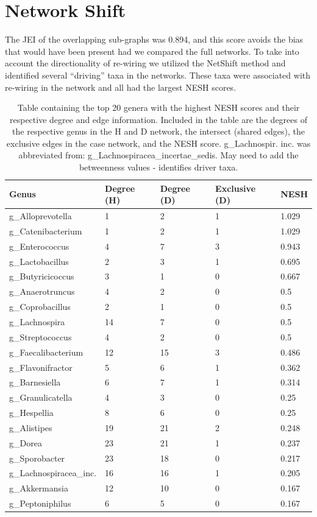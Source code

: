 \section{Network Shift}\label{res:shift}
The \acrfull{JEI} of the overlapping sub-graphs was 0.894, and this score avoids the bias that would have been present had we compared the full networks. To take into account the directionality of re-wiring we utilized the NetShift method and identified several ``driving'' taxa in the networks. These taxa were associated with re-wiring in the network and all had the largest \acrshort{NESH} scores. 
\begin{table}[!hbt]
\centering
\begin{tabular}{lllll}
\toprule
Genus & Degree (H) & Degree (D)  & Exclusive (D) &\acrshort{NESH}\\
\midrule
g\_Alloprevotella & 1 & 2 & 1 & 1.029\\
g\_Catenibacterium & 1 & 2 & 1 & 1.029\\
g\_Enterococcus & 4 & 7 & 3 & 0.943\\
g\_Lactobacillus & 2 & 3 & 1 & 0.695\\
g\_Butyricicoccus & 3 & 1 & 0 & 0.667\\
g\_Anaerotruncus & 4 & 2 & 0 & 0.5\\
g\_Coprobacillus & 2 & 1 & 0 & 0.5\\
g\_Lachnospira & 14 & 7 & 0 & 0.5\\
g\_Streptococcus & 4 & 2 & 0 & 0.5\\
g\_Faecalibacterium & 12 & 15 & 3 & 0.486\\
g\_Flavonifractor & 5 & 6 & 1 & 0.362\\
g\_Barnesiella & 6 & 7 & 1 & 0.314\\
g\_Granulicatella & 4 & 3 & 0 & 0.25\\
g\_Hespellia & 8 & 6 & 0 & 0.25\\
g\_Alistipes & 19 & 21 & 2 & 0.248\\
g\_Dorea & 23 & 21 & 1 & 0.237\\
g\_Sporobacter & 23 & 18 & 0 & 0.217\\
g\_Lachnospiracea\_inc.& 16 & 16 & 1 & 0.205\\
g\_Akkermansia & 12 & 10 & 0 & 0.167\\
g\_Peptoniphilus & 6 & 5 & 0 & 0.167\\
  \bottomrule
\end{tabular}
\caption[Table containing the top 20 genera with the highest \acrshort{NESH} scores and their respective degree and edge information.]{Table containing the top 20 genera with the highest \acrshort{NESH} scores and their respective degree and edge information. Included in the table are the degrees of the respective genus in the \acrfull{H} and \acrfull{D} network, the intersect (shared edges), the exclusive edges in the case network, and the \acrshort{NESH} score. g\_Lachnospir. inc. was abbreviated from: g\_Lachnospiracea\_incertae\_sedis. May need to add the betweenness values - identifies driver taxa.}
\label{tab:nesh}
\end{table}

